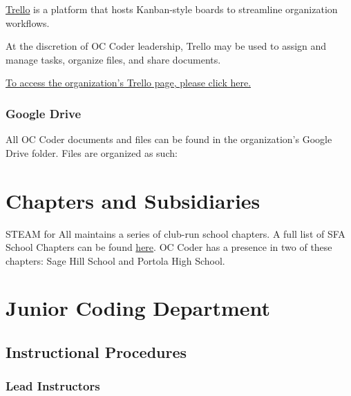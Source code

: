 \documentclass[twoside,11pt,letterpaper,abstracton]{scrartcl}
\begin{document}
\href{https://trello.com}{Trello} is a platform that hosts Kanban-style boards to streamline organization workflows. 

At the discretion of OC Coder leadership, Trello may be used to assign and manage tasks, organize files, and share documents. 

\begin{resource}
    \href{}{To access the organization's Trello page, please click here.}
\end{resource}

\subsubsection{Google Drive} \label{com-googledrive}

All OC Coder documents and files can be found in the organization's Google Drive folder. Files are organized as such:


\newpage

\section{Chapters and Subsidiaries} \label{schoolchapters}

STEAM for All maintains a series of club-run school chapters. A full list of SFA School Chapters can be found \href{}{here}. OC Coder has a presence in two of these chapters: Sage Hill School and Portola High School.

\newpage

\section{Junior Coding Department} \label{jcc}

\subsection{Instructional Procedures}

\subsubsection{Lead Instructors}
\end{document}
